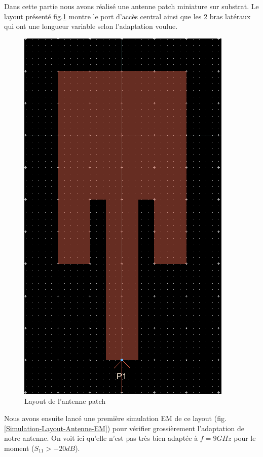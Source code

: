 \documentclass[a4paper]{article}
\begin{document}
Dans cette partie nous avons r\'ealis\'e une antenne patch miniature sur substrat. Le layout pr\'esent\'e fig.\ref{patch_antenna} montre le port d'acc\`es
central ainsi que les 2 bras lat\'eraux qui ont une longueur variable selon l'adaptation voulue.
\begin{figure}[!htb]
\begin{center}
  \includegraphics[scale=0.35]{patch_antenna.png}
  \caption{Layout de l'antenne patch}
  \label{patch_antenna}
\end{center}
\end{figure}

Nous avons ensuite lanc\'e une premi\`ere simulation EM de ce layout (fig.\ref{Simulation-Layout-Antenne-EM}) pour v\'erifier grossi\`erement l'adaptation de notre antenne.
On voit ici qu'elle n'est pas tr\`es bien adapt\'ee \`a $f = 9 GHz$ pour le moment ($S_{11} > -20dB$).
\clearpage
\end{document}
